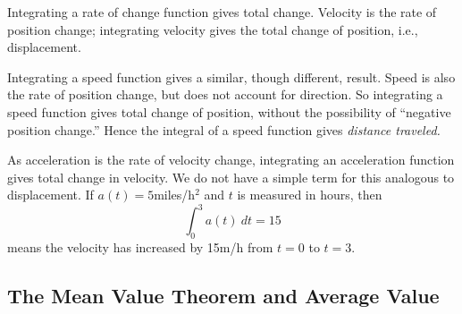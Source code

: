 Integrating a rate of change function gives total change. Velocity is the rate of position change; integrating velocity gives the total change of position, i.e., displacement.

Integrating a speed function gives a similar, though different, result. Speed is also the rate of position change, but does not account for direction. So integrating a speed function gives total change of position, without the possibility of ``negative position change.'' Hence the integral of a speed function gives \textit{distance traveled.}


As acceleration is the rate of velocity change, integrating an acceleration function gives total change in velocity. We do not have a simple term for this analogous to displacement. If $a(t) = 5$miles/h$^2$ and $t$ is measured in hours, then 
\[\int_0^3 a(t)\ dt = 15\]
means the velocity has increased by 15m/h from $t=0$ to $t=3$.

\subsection{The Mean Value Theorem and Average Value}

